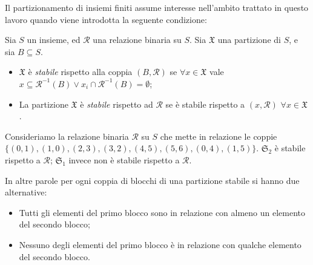 Il partizionamento di insiemi finiti assume interesse nell'ambito trattato in questo lavoro quando viene introdotta la seguente condizione:
\begin{definition}
    Sia $S$ un insieme, ed $\mathcal{R}$ una relazione binaria su $S$. Sia $\mathfrak{X}$ una partizione di $S$, e sia $B \subseteq S$.
    \begin{itemize}
        \item $\mathfrak{X}$ è \emph{stabile} rispetto alla coppia $(B,\mathcal{R})$ se $\forall x \in \mathfrak{X}$ vale $x \subseteq \mathcal{R}^{-1}(B) \lor x_i \cap \mathcal{R}^{-1}(B) = \emptyset$;
        \item La partizione $\mathfrak{X}$ è \emph{stabile} rispetto ad $\mathcal{R}$ se è stabile rispetto a $(x,\mathcal{R}) \,\,\forall x \in \mathfrak{X}$.
    \end{itemize}
\end{definition}

\begin{example}
    \label{exa:set_partition_stable}
    Consideriamo la relazione binaria $\mathcal{R}$ su $S$ che mette in relazione le coppie $\{(0,1),(1,0),(2,3),(3,2),(4,5),(5,6),(0,4),(1,5)\}$. $\mathfrak{S}_2$ è stabile rispetto a $\mathcal{R}$; $\mathfrak{S}_1$ invece non è stabile rispetto a $\mathcal{R}$.
\end{example}

In altre parole per ogni coppia di blocchi di una partizione stabile si hanno due alternative:
\begin{itemize}
    \item Tutti gli elementi del primo blocco sono in relazione con almeno un elemento del secondo blocco;
    \item Nessuno degli elementi del primo blocco è in relazione con qualche elemento del secondo blocco.
\end{itemize}


